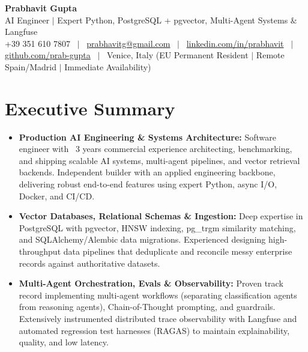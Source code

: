\documentclass[a4paper,10pt]{article}
\begin{document}
\begin{minipage}[c]{0.80\textwidth}
  {\Huge\bfseries Prabhavit Gupta}\\[3pt]
  {\color{accent}\large AI Engineer $\vert$ Expert Python, PostgreSQL + pgvector, Multi-Agent Systems $\&$ Langfuse}\\[6pt]
  {\footnotesize +39 351 610 7807 ~$\vert$~
  \href{mailto:prabhavitg@gmail.com}{prabhavitg@gmail.com} ~$\vert$~
  \href{https://www.linkedin.com/in/prabhavit/}{linkedin.com/in/prabhavit} ~$\vert$~
  \href{https://github.com/prab-gupta}{github.com/prab-gupta} ~$\vert$~
  Venice, Italy (EU Permanent Resident $\vert$ Remote Spain/Madrid $\vert$ Immediate Availability)}
\end{minipage}\hfill

\vspace{6pt}

\section{Executive Summary}
\begin{itemize}
  \item \textbf{Production AI Engineering \& Systems Architecture:} Software engineer with ~3 years commercial experience architecting, benchmarking, and shipping scalable AI systems, multi-agent pipelines, and vector retrieval backends. Independent builder with an applied engineering backbone, delivering robust end-to-end features using expert Python, async I/O, Docker, and CI/CD.
  \item \textbf{Vector Databases, Relational Schemas \& Ingestion:} Deep expertise in PostgreSQL with pgvector, HNSW indexing, pg\_trgm similarity matching, and SQLAlchemy/Alembic data migrations. Experienced designing high-throughput data pipelines that deduplicate and reconcile messy enterprise records against authoritative datasets.
  \item \textbf{Multi-Agent Orchestration, Evals \& Observability:} Proven track record implementing multi-agent workflows (separating classification agents from reasoning agents), Chain-of-Thought prompting, and guardrails. Extensively instrumented distributed trace observability with Langfuse and automated regression test harnesses (RAGAS) to maintain explainability, quality, and low latency.
\end{itemize}

\end{document}
